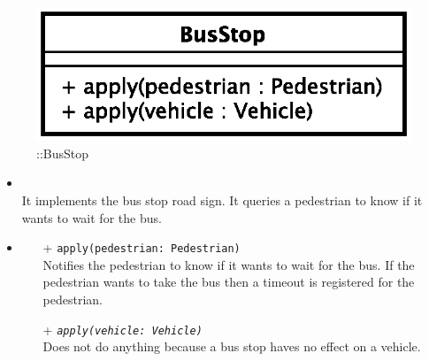 \begin{figure}[h]
\centering
\includegraphics[scale=0.6,keepaspectratio]{images/solution/app/backend/bus_stop.eps}
\caption{\pPassive::BusStop}
\label{fig:sd-app-bus_stop}
\end{figure}
\FloatBarrier
\begin{itemize}
  \item \textbf{\descr} \\
It implements the bus stop road sign. It queries a pedestrian to know if it wants to wait for the bus.
  \item \textbf{\ops}
  \begin{itemize} 
  \item[+] \texttt{apply(pedestrian: Pedestrian)} \\
Notifies the pedestrian to know if it wants to wait for the bus. If the pedestrian wants
to take the bus then a timeout is registered for the pedestrian.
    \item[+] \texttt{\textit{apply(vehicle: Vehicle)}} \\
Does not do anything because a bus stop haves no effect on a vehicle.
  \end{itemize}
\end{itemize}

